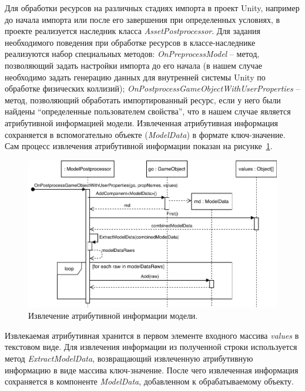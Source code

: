 Для обработки ресурсов на различных стадиях импорта в проект Unity,
например до начала импорта или после его завершения при определенных условиях,
в проекте реализуется наследник класса \emph{AssetPostprocessor}.
Для задания необходимого поведения при обработке ресурсов
в классе-наследнике реализуются набор специальных методов:
\emph{OnPreprocessModel} -- метод, позволяющий задать настройки импорта до его начала
(в нашем случае необходимо задать генерацию данных для внутренней
системы Unity по обработке физических коллизий);
\emph{OnPostprocessGameObjectWithUserProperties} -- метод, позволяющий
обработать импортированный ресурс, если у него были найдены
``определенные пользователем свойства'', что в нашем случае
является атрибутивной информацией модели.%
\cite{DocUnity}
Извлеченная атрибутивная информация сохраняется в вспомогательно объекте
(\emph{ModelData}) в формате ключ-значение.
Сам процесс извлечения атрибутивной информации показан
на рисунке~\ref{figure:SPostprocessor}.

\begin{figure}[!htp]
    \centering
    \includegraphics[width=1.0\textwidth]{images/UML-SPostprocessor.pdf}
    \caption{Извлечение атрибутивной информации модели.}
    \label{figure:SPostprocessor}
\end{figure}

Извлекаемая атрибутивная хранится в первом элементе
входного массива \emph{values} в текстовом виде.%
\cite{DocUnity}
Для извлечения информации из полученной строки используется метод
\emph{ExtractModelData}, возвращающий извлеченную атрибутивную информацию
в виде массива ключ-значение.
После чего извлеченная информация сохраняется в компоненте \emph{ModelData},
добавленном к обрабатываемому объекту.
